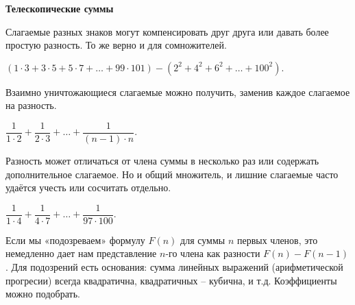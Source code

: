 \documentclass{article}
\begin{document}
    \large

    \begin{center}
        \textbf{Телескопические суммы}
    \end{center}

    Слагаемые разных знаков могут компенсировать друг друга или давать более простую разность.
    То же верно и для сомножителей.

    \begin{enumerate_boxed}

        \setcounter{enumi}{-3}

        \item $(1\cdot 3+3\cdot 5+5\cdot 7+ \dotsc +99\cdot 101) - (2^2+4^2+6^2+ \dotsc +100^2).$
    \end{enumerate_boxed}

    Взаимно уничтожающиеся слагаемые можно получить, заменив каждое слагаемое на разность.

    \begin{enumerate_boxed}

        \setcounter{enumi}{-2}

        \item $\dfrac{1}{1 \cdot 2} + \dfrac{1}{2 \cdot 3} + \dotsc +  \dfrac{1}{(n-1) \cdot n}.$


    \end{enumerate_boxed}

    Разность может отличаться от члена суммы в несколько раз или содержать дополнительное слагаемое.
    Но и общий множитель, и лишние слагаемые часто удаётся учесть или сосчитать отдельно.

    \begin{enumerate_boxed}

        \setcounter{enumi}{-1}

        \item $\dfrac{1}{1 \cdot 4} + \dfrac{1}{4 \cdot 7} + \dotsc +  \dfrac{1}{97 \cdot 100}.$

    \end{enumerate_boxed}

    Если мы «подозреваем» формулу $F(n)$ для суммы $n$ первых членов, это немедленно дает нам представление $n$-го члена как разности $F(n)-F(n-1)$.
    Для подозрений есть основания: сумма линейных выражений (арифметической прогресии) всегда квадратична, квадратичных – кубична, и т.д. Коэффициенты можно подобрать.
\end{document}
